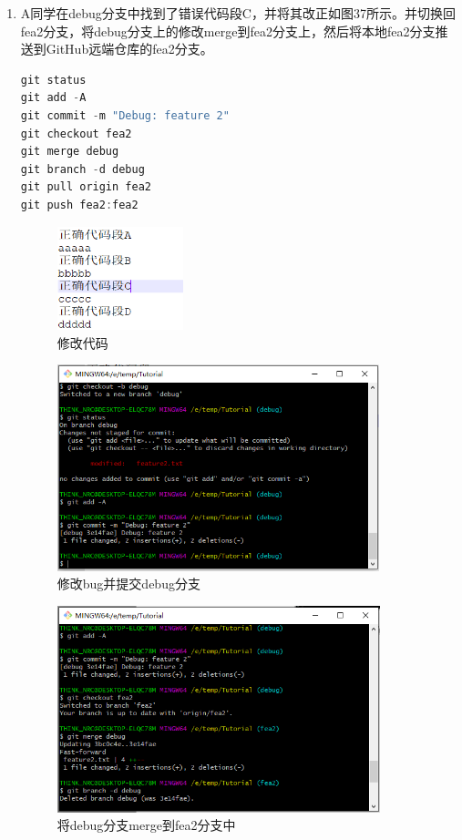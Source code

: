 \documentclass[a4paper,14pt]{article}
\begin{document}
\begin{enumerate}[1. ]
\item A同学在debug分支中找到了错误代码段C，并将其改正如图37所示。并切换回fea2分支，将debug分支上的修改merge到fea2分支上，然后将本地fea2分支推送到GitHub远端仓库的fea2分支。
{\color{red}
\begin{lstlisting}[language=C]
git status
git add -A
git commit -m "Debug: feature 2"
git checkout fea2
git merge debug
git branch -d debug
git pull origin fea2
git push fea2:fea2
\end{lstlisting}
}
\begin{figure}[h]
\centering
\includegraphics[height=3cm]{figure/stepB5}
\caption{修改代码}
\end{figure}
\begin{figure}[h]
\centering
\includegraphics[height=6cm]{figure/stepB6}
\caption{修改bug并提交debug分支}
\end{figure}
\begin{figure}[h]
\centering
\includegraphics[height=6cm]{figure/stepB7}
\caption{将debug分支merge到fea2分支中}
\end{figure}

\end{enumerate}
\end{document}
